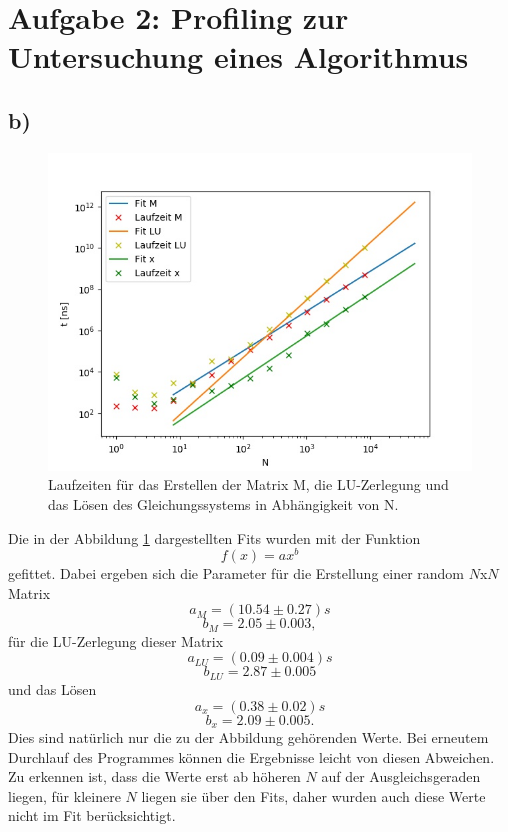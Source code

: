 \section*{Aufgabe 2: Profiling zur Untersuchung eines Algorithmus}

\subsection*{b)}

  \begin{figure}
    \includegraphics{../../Blatt2/Plots/plot2.jpg}
    \caption{Laufzeiten für das Erstellen der Matrix M, die LU-Zerlegung und das Lösen des Gleichungssystems in Abhängigkeit von N.}
    \label{fig:A2}
  \end{figure}

  \noindent Die in der Abbildung \ref{fig:A2} dargestellten Fits wurden mit der Funktion
  \begin{equation}
    f(x)=a x^b
  \end{equation}
  gefittet. Dabei ergeben sich die Parameter für die Erstellung einer random $N$x$N$ Matrix
  $$a_M = (10.54 \pm 0.27) s$$
  $$b_M = 2.05 \pm 0.003 ,$$
  für die LU-Zerlegung dieser Matrix
  $$a_{LU} = (0.09 \pm 0.004) s$$
  $$b_{LU} = 2.87 \pm 0.005$$
  und das Lösen
  $$a_x = (0.38 \pm 0.02) s$$
  $$b_x = 2.09 \pm 0.005.$$
  Dies sind natürlich nur die zu der Abbildung gehörenden Werte. Bei erneutem Durchlauf des Programmes
  können die Ergebnisse leicht von diesen Abweichen. Zu erkennen ist, dass die Werte erst ab höheren $N$
  auf der Ausgleichsgeraden liegen, für kleinere $N$ liegen sie über den Fits, daher wurden auch diese
  Werte nicht im Fit berücksichtigt.

